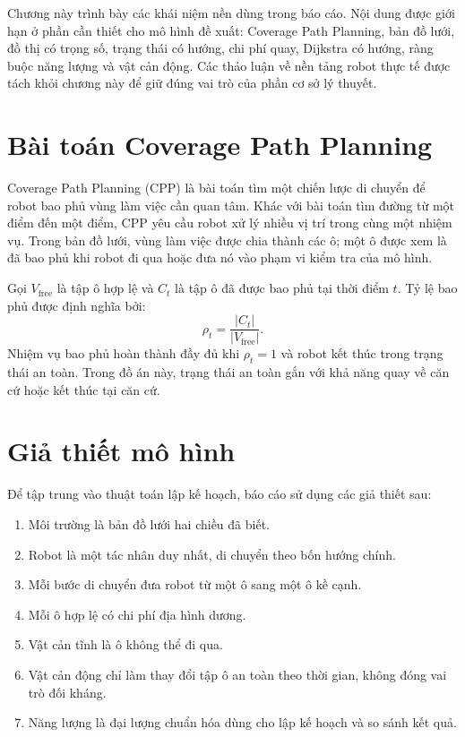 \documentclass[../DoAn.tex]{subfiles}
\begin{document}
Chương này trình bày các khái niệm nền dùng trong báo cáo. Nội dung được giới hạn ở phần cần thiết cho mô hình đề xuất: Coverage Path Planning, bản đồ lưới, đồ thị có trọng số, trạng thái có hướng, chi phí quay, Dijkstra có hướng, ràng buộc năng lượng và vật cản động. Các thảo luận về nền tảng robot thực tế được tách khỏi chương này để giữ đúng vai trò của phần cơ sở lý thuyết.

\section{Bài toán Coverage Path Planning}

Coverage Path Planning (CPP) là bài toán tìm một chiến lược di chuyển để robot bao phủ vùng làm việc cần quan tâm. Khác với bài toán tìm đường từ một điểm đến một điểm, CPP yêu cầu robot xử lý nhiều vị trí trong cùng một nhiệm vụ. Trong bản đồ lưới, vùng làm việc được chia thành các ô; một ô được xem là đã bao phủ khi robot đi qua hoặc đưa nó vào phạm vi kiểm tra của mô hình.

Gọi $V_{\text{free}}$ là tập ô hợp lệ và $C_t$ là tập ô đã được bao phủ tại thời điểm $t$. Tỷ lệ bao phủ được định nghĩa bởi:
\begin{equation}
\rho_t=\frac{|C_t|}{|V_{\text{free}}|}.
\end{equation}
Nhiệm vụ bao phủ hoàn thành đầy đủ khi $\rho_t=1$ và robot kết thúc trong trạng thái an toàn. Trong đồ án này, trạng thái an toàn gắn với khả năng quay về căn cứ hoặc kết thúc tại căn cứ.

\section{Giả thiết mô hình}

Để tập trung vào thuật toán lập kế hoạch, báo cáo sử dụng các giả thiết sau:
\begin{enumerate}
\item Môi trường là bản đồ lưới hai chiều đã biết.
\item Robot là một tác nhân duy nhất, di chuyển theo bốn hướng chính.
\item Mỗi bước di chuyển đưa robot từ một ô sang một ô kề cạnh.
\item Mỗi ô hợp lệ có chi phí địa hình dương.
\item Vật cản tĩnh là ô không thể đi qua.
\item Vật cản động chỉ làm thay đổi tập ô an toàn theo thời gian, không đóng vai trò đối kháng.
\item Năng lượng là đại lượng chuẩn hóa dùng cho lập kế hoạch và so sánh kết quả.
\end{enumerate}
\end{document}
